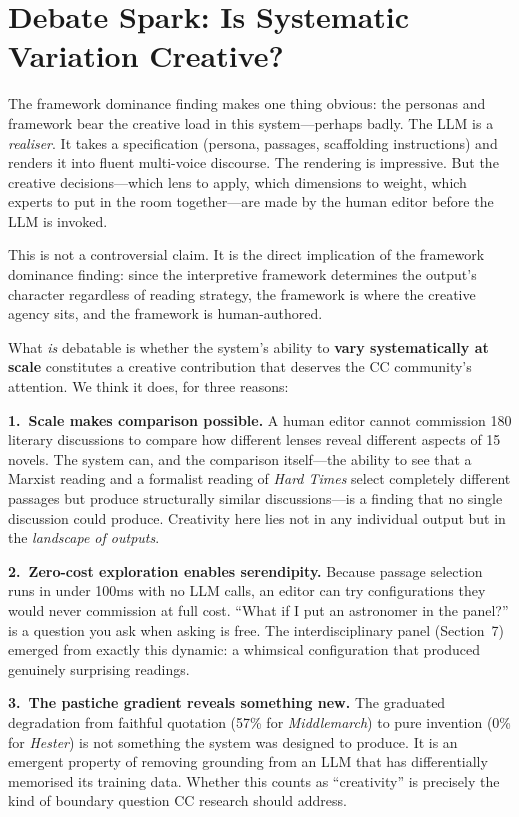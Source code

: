 \documentclass[letterpaper]{article}
\begin{document}
\section{Debate Spark: Is Systematic Variation Creative?}

The framework dominance finding makes one thing obvious: the personas and
framework bear the creative load in this system---perhaps badly.  The
LLM is a \emph{realiser}.  It takes a specification (persona, passages,
scaffolding instructions) and renders it into fluent multi-voice
discourse.  The rendering is impressive.  But the creative decisions---which
lens to apply, which dimensions to weight, which experts to put in
the room together---are made by the human editor before the LLM is
invoked.

This is not a controversial claim.  It is the direct implication of
the framework dominance finding: since the interpretive framework determines
the output's character regardless of reading strategy, the framework
is where the creative agency sits, and the framework is
human-authored.

What \emph{is} debatable is whether the system's ability to
\textbf{vary systematically at scale} constitutes a creative
contribution that deserves the CC community's attention.  We think it
does, for three reasons:

\textbf{1.~Scale makes comparison possible.}  A human editor cannot
commission 180 literary discussions to compare how different lenses
reveal different aspects of 15 novels.  The system can, and the
comparison itself---the ability to see that a Marxist reading and a
formalist reading of \emph{Hard Times} select completely different
passages but produce structurally similar discussions---is a finding
that no single discussion could produce.  Creativity here lies not in
any individual output but in the \emph{landscape of outputs}.

\textbf{2.~Zero-cost exploration enables serendipity.}  Because
passage selection runs in under 100ms with no LLM calls, an editor
can try configurations they would never commission at full cost.
``What if I put an astronomer in the panel?'' is a question you ask
when asking is free.  The interdisciplinary panel (Section~7) emerged
from exactly this dynamic: a whimsical configuration that produced
genuinely surprising readings.

\textbf{3.~The pastiche gradient reveals something new.}  The
graduated degradation from faithful quotation (57\% for
\emph{Middlemarch}) to pure invention (0\% for \emph{Hester}) is not
something the system was designed to produce.  It is an emergent
property of removing grounding from an LLM that has differentially
memorised its training data.  Whether this counts as ``creativity'' is
precisely the kind of boundary question CC research should address.
\end{document}
